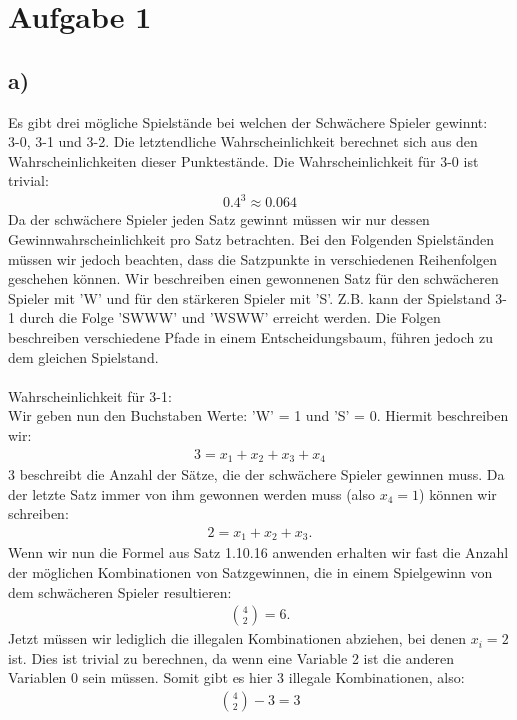 \section*{Aufgabe 1}
\subsection*{a)}
Es gibt drei mögliche Spielstände bei welchen der Schwächere Spieler gewinnt: \\
3-0, 3-1 und 3-2. Die letztendliche Wahrscheinlichkeit berechnet sich aus den Wahrscheinlichkeiten dieser Punktestände. Die Wahrscheinlichkeit für 3-0 ist trivial: \\
\begin{align*}
  0.4^3 \approx 0.064
\end{align*}
Da der schwächere Spieler jeden Satz gewinnt müssen wir nur dessen Gewinnwahrscheinlichkeit pro Satz betrachten. Bei den Folgenden Spielständen müssen wir jedoch beachten, dass die Satzpunkte in verschiedenen Reihenfolgen geschehen können. Wir beschreiben einen gewonnenen Satz für den schwächeren Spieler mit 'W' und für den stärkeren Spieler mit 'S'. Z.B. kann der Spielstand 3-1 durch die Folge 'SWWW' und 'WSWW' erreicht werden. Die Folgen beschreiben verschiedene Pfade in einem Entscheidungsbaum, führen jedoch zu dem gleichen Spielstand.\\\\
Wahrscheinlichkeit für 3-1: \\
Wir geben nun den Buchstaben Werte: 'W' = 1 und 'S' = 0. Hiermit beschreiben wir:
\begin{align*}
  3 = x_1 + x_2 + x_3 + x_4
\end{align*}
3 beschreibt die Anzahl der Sätze, die der schwächere Spieler gewinnen muss. Da der letzte Satz immer von ihm gewonnen werden muss (also $ x_4 = 1 $) können wir schreiben:
\begin{align*}
  2 = x_1 + x_2 + x_3.
\end{align*}
Wenn wir nun die Formel aus Satz 1.10.16 anwenden erhalten wir fast die Anzahl der möglichen Kombinationen von Satzgewinnen, die in einem Spielgewinn von dem schwächeren Spieler resultieren:
\begin{align*}
  \binom{4}{2} = 6.
\end{align*}
Jetzt müssen wir lediglich die illegalen Kombinationen abziehen, bei denen $ x_i = 2 $ ist. Dies ist trivial zu berechnen, da wenn eine Variable 2 ist die anderen Variablen 0 sein müssen. Somit gibt es hier 3 illegale Kombinationen, also:
\begin{align*}
  \binom{4}{2} - 3 = 3
\end{align*}
